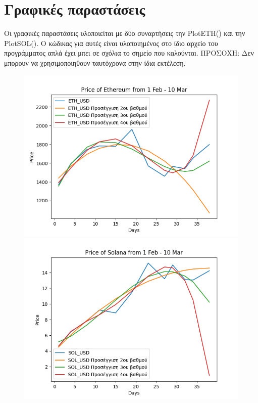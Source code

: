 \documentclass{article}
\begin{document}
    \section{Γραφικές παραστάσεις}
    Οι γραφικές παραστάσεις υλοποιείται με δύο συναρτήσεις την PlotETH() και την PlotSOL(). Ο κώδικας για αυτές
    είναι υλοποιημένος στο ίδιο αρχείο του προγράμματος απλά έχει μπει σε σχόλια το σημείο που καλούνται.
    ΠΡΟΣΟΧΗ: Δεν μπορουν να χρησιμοποιηθουν ταυτόχρονα στην ίδια εκτέλεση.
    \begin{figure}[b]
    \includegraphics[width=12cm]{ETH_USD.png}
    \includegraphics[width=12cm]{SOL_USD.png}
    \end{figure}
    
    
\end{document}
